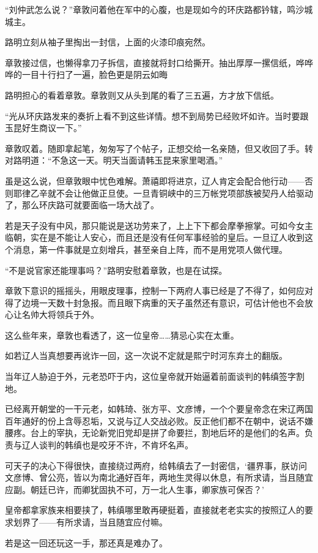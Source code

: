 “刘仲武怎么说？”章敦问着他在军中的心腹，也是现如今的环庆路都钤辖，鸣沙城城主。 

路明立刻从袖子里掏出一封信，上面的火漆印痕宛然。 

章敦接过信，也懒得拿刀子拆信，直接就将封口给撕开。抽出厚厚一摞信纸，哗哗哗的一目十行扫了一遍，脸色更是阴云如晦 

路明担心的看着章敦。章敦则又从头到尾的看了三五遍，方才放下信纸。 

“光从环庆路发来的奏折上看不到这些详情。想不到局势已经败坏如许。当时要跟玉昆好生商议一下。” 

章敦叹着。随即拿起笔，匆匆写了个帖子，正想交给一名亲随，但又收回了手。转对路明道：“不急这一天。明天当面请韩玉昆来家里喝酒。” 

虽是这么说，但章敦眼中忧色难解。萧禧即将进京，辽人肯定会配合他行动——否则耶律乙辛就不会让他做正旦使。一旦青铜峡中的三万帐党项部族被契丹人给驱动了，那么环庆路可就要面临一场大战了。 

若是天子没有中风，那只能说是送功劳来了，上上下下都会摩拳擦掌。可如今女主临朝，实在是不能让人安心，而且还是没有任何军事经验的皇后。一旦辽人收到这个消息，第一件事就是立刻增兵，甚至亲自上阵，而不是用党项人做代理。 

“不是说官家还能理事吗？”路明安慰着章敦，也是在试探。 

章敦下意识的摇摇头，用眼皮理事，控制一下两府人事已经是了不得了，如何应对得了边境一天数十封急报。而且眼下病重的天子虽然还有意识，可估计他也不会放心让名帅大将领兵于外。 

这么些年来，章敦也看透了，这一位皇帝……猜忌心实在太重。 

如若辽人当真想要再讹诈一回，这一次说不定就是熙宁时河东弃土的翻版。 

当年辽人胁迫于外，元老恐吓于内，这位皇帝就开始逼着前面谈判的韩缜签字割地。 

已经离开朝堂的一干元老，如韩琦、张方平、文彦博，一个个要皇帝念在宋辽两国百年通好的份上含辱忍垢，又说与辽人交战必败。反正他们都不在朝中，说话不嫌腰疼。台上的宰执，无论新党旧党却是拼了命要拦，割地后坏的是他们的名声。负责与辽人谈判的韩缜也是咬牙不许，不肯坏名声。 

可天子的决心下得很快，直接绕过两府，给韩缜去了一封密信，‘疆界事，朕访问文彦博、曾公亮，皆以为南北通好百年，两地生灵得以休息，有所求请，当且随宜应副。朝廷已许，而卿犹固执不可，万一北人生事，卿家族可保否？’ 

皇帝都拿家族来相要挟了，韩缜哪里敢再硬挺着，直接就老老实实的按照辽人的要求划界了——有所求请，当且随宜应付嘛。 

若是这一回还玩这一手，那还真是难办了。 

